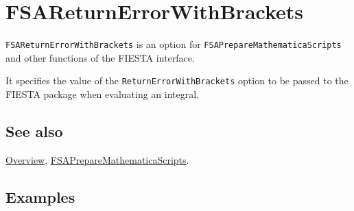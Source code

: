 \documentclass[../FeynHelpersManual.tex]{subfiles}
\begin{document}
\begin{Shaded}
\begin{Highlighting}[]
 
\end{Highlighting}
\end{Shaded}

\hypertarget{fsareturnerrorwithbrackets}{
\section{FSAReturnErrorWithBrackets}\label{fsareturnerrorwithbrackets}}

\texttt{FSAReturnErrorWithBrackets} is an option for
\texttt{FSAPrepareMathematicaScripts} and other functions of the FIESTA
interface.

It specifies the value of the \texttt{ReturnErrorWithBrackets} option to
be passed to the FIESTA package when evaluating an integral.

\subsection{See also}

\hyperlink{toc}{Overview},
\hyperlink{fsapreparemathematicascripts}{FSAPrepareMathematicaScripts}.

\subsection{Examples}
\end{document}
